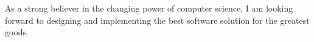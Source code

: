 

\begin{cvparagraph}
As a strong believer in the changing power of computer science, I am looking forward to designing and implementing the best software solution for the greatest goods. 
\end{cvparagraph}
